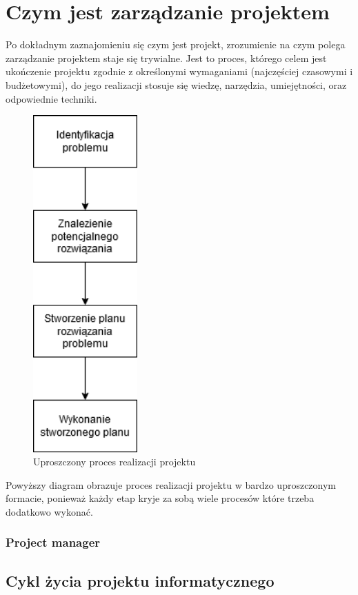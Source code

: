 \documentclass[oneside,polski,logo]{amuthesis}
\begin{document}
\section {Czym jest zarządzanie projektem}
Po dokładnym zaznajomieniu się czym jest projekt, zrozumienie na czym polega zarządzanie projektem staje się trywialne. Jest to proces, którego celem jest ukończenie projektu zgodnie z określonymi wymaganiami (najczęściej czasowymi i budżetowymi), do jego realizacji stosuje się wiedzę, narzędzia, umiejętności, oraz odpowiednie techniki. 
\begin{figure}[h]
	\centering
	\includegraphics[width=4cm]{images/hyps/diagram-zarzadzania-projektem.png}
	\caption{Uproszczony proces realizacji projektu}
\end{figure}

Powyższy diagram obrazuje proces realizacji projektu w bardzo uproszczonym formacie, ponieważ każdy etap kryje za sobą wiele procesów które trzeba dodatkowo wykonać.
\subsubsection {Project manager}


\subsection{Cykl życia projektu informatycznego}
\end{document}
